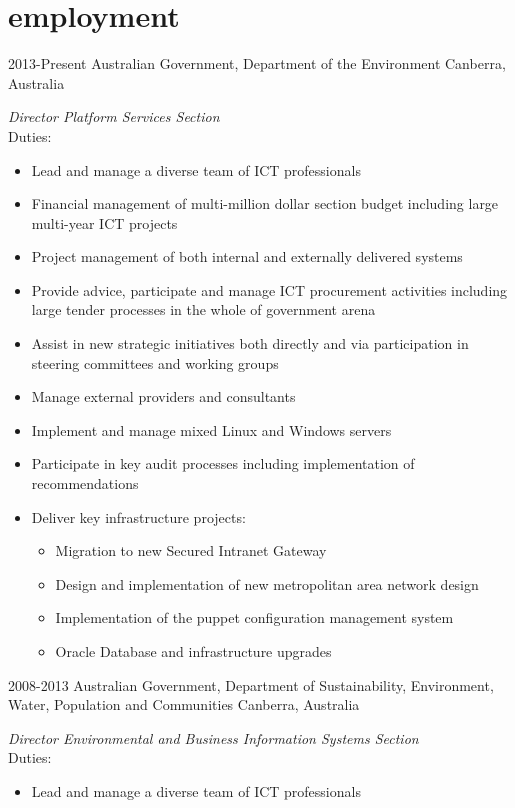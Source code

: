 \documentclass{resume} %
\begin{document}
\section{employment}
\begin{entrylist}
\entry
{2013-Present}
{Australian Government, Department of the Environment}
{Canberra, Australia}
{\emph{Director Platform Services Section} \\
Duties:
\begin{itemize}
\item Lead and manage a diverse team of ICT professionals
\item Financial management of multi-million dollar section budget including large multi-year ICT projects
\item Project management of both internal and externally delivered systems
\item Provide advice, participate and manage ICT procurement activities including large tender processes in the whole of government arena
\item Assist in new strategic initiatives both directly and via participation in steering committees and working groups
\item Manage external providers and consultants
\item Implement and manage mixed Linux and Windows servers
\item Participate in key audit processes including implementation of recommendations
\item Deliver key infrastructure projects:
\begin{itemize}
\item Migration to new Secured Intranet Gateway
\item Design and implementation of new metropolitan area network design
\item Implementation of the puppet configuration management system
\item Oracle Database and infrastructure upgrades
\end{itemize}
\end{itemize}}
\entry
{2008-2013}
{Australian Government, Department of Sustainability, Environment, Water, Population and Communities}
{Canberra, Australia}
{\emph{Director Environmental and Business Information Systems Section} \\
Duties:
\begin{itemize}
\item Lead and manage a diverse team of ICT professionals

\end{itemize}}
\end{entrylist}
\end{document}
